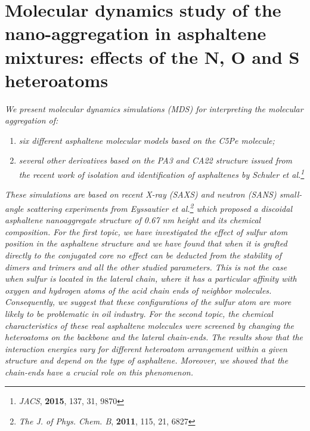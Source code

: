 \singlespacing
\chapter[Molecular dynamics study of the nano-aggregation in asphaltene]{Molecular dynamics study of the nano-aggregation in asphaltene mixtures: effects of the N, O and S heteroatoms}
\minitoc
\restoregeometry

\newpage


\textit{We present molecular dynamics simulations (MDS) for interpreting the molecular aggregation of:}
\begin{enumerate}
	\item \textit{six different asphaltene molecular models based on the C5Pe molecule;}
	\item \textit{several other derivatives based on the PA3 and CA22 structure issued from the recent work of isolation and identification of asphaltenes by Schuler \textit{et al.}\footnote{\textit{JACS}, \textbf{2015}, 137, 31, 9870}}
\end{enumerate}    

\textit{These simulations are based on recent X-ray (SAXS) and neutron (SANS) small-angle scattering experiments from Eyssautier \textit{et al.}\footnote{\textit{The J. of Phys. Chem. B}, \textbf{2011}, 115, 21, 6827} which proposed a discoidal asphaltene nanoaggregate structure of 0.67 nm height and its chemical composition. For the first topic, we have investigated the effect of sulfur atom position in the asphaltene structure and we have found that when it is grafted directly to the conjugated core no effect can be deducted from the stability of dimers and trimers and all the other studied parameters. This is not the case when sulfur is located in the lateral chain, where it has a particular affinity with oxygen and hydrogen atoms of the acid chain ends of neighbor molecules. Consequently, we suggest that these configurations of the sulfur atom are more likely to be problematic in oil industry. For the second topic, the chemical characteristics of these real asphaltene molecules were screened by changing the heteroatoms on the backbone and the lateral chain-ends. The results show that the interaction energies vary for different heteroatom arrangement within a given structure and depend on the type of asphaltene. Moreover, we showed that the chain-ends have a crucial role on this phenomenon.}

\clearpage

